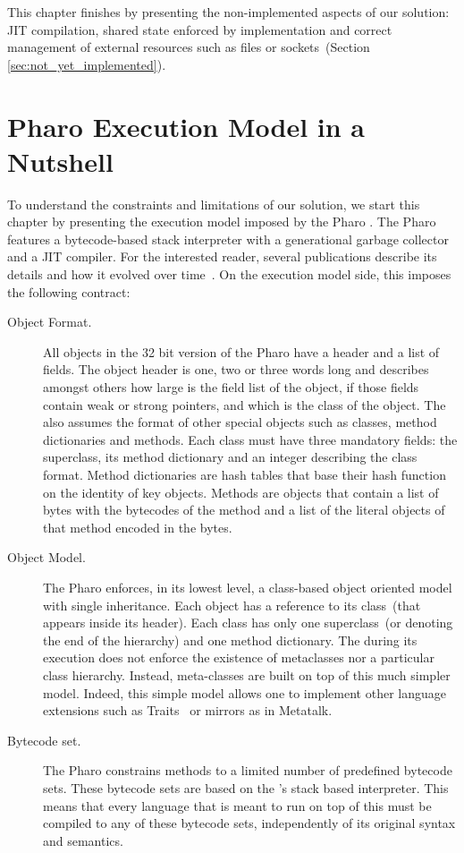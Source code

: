 This chapter finishes by presenting the non-implemented aspects of our solution: JIT compilation, shared state enforced by \VM implementation and correct management of external resources such as files or sockets~(Section \ref{sec:not_yet_implemented}).

\section{Pharo Execution Model in a Nutshell}\label{sec:pharo_execution_model}

To understand the constraints and limitations of our solution, we start this chapter by presenting the execution model imposed by the Pharo \VM. The Pharo \VM features a bytecode-based stack interpreter with a generational garbage collector and a JIT compiler. For the interested reader, several publications describe its details and how it evolved over time~\cite{Gold83a,Inga97a,Mira11a}. On the execution model side, this \VM imposes the following contract:

\begin{description}

\item[Object Format.] All objects in the 32 bit version of the Pharo \VM have a header and a list of fields. The object header is one, two or three words long and describes amongst others how large is the field list of the object, if those fields contain weak or strong pointers, and which is the class of the object. The \VM also assumes the format of other special objects such as classes, method dictionaries and methods. Each class must have three mandatory fields: the superclass, its method dictionary and an integer describing the class format. Method dictionaries are hash tables that base their hash function on the identity of key objects. Methods are objects that contain a list of bytes with the bytecodes of the method and a list of the literal objects of that method encoded in the bytes.

\item[Object Model.] The Pharo \VM enforces, in its lowest level, a class-based object oriented model with single inheritance. Each object has a reference to its class~(that appears inside its header). Each class has only one superclass~(or  denoting the end of the hierarchy) and one method dictionary. The \VM during its execution does not enforce the existence of metaclasses nor a particular class hierarchy. Instead, meta-classes are built on top of this much simpler model. Indeed, this simple model allows one to implement other language extensions such as Traits~\cite{Scha03a} or mirrors as in Metatalk\cite{Papo11a}.

\item[Bytecode set.] The Pharo \VM constrains methods to a limited number of predefined bytecode sets. These bytecode sets are based on the \VM's stack based interpreter. This means that every language that is meant to run on top of this \VM must be compiled to any of these bytecode sets, independently of its original syntax and semantics. 

\end{description}

